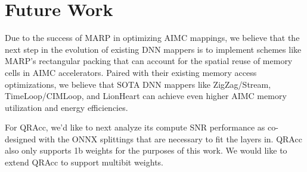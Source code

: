 \section{Future Work}

Due to the success of MARP in optimizing AIMC mappings, we believe that the next step in the evolution of existing DNN mappers is to implement schemes like MARP's rectangular packing that can account for the spatial reuse of memory cells in AIMC accelerators. Paired with their existing memory access optimizations, we believe that SOTA DNN mappers like ZigZag/Stream, TimeLoop/CIMLoop, and LionHeart can achieve even higher AIMC memory utilization and energy efficiencies. 

For QRAcc, we'd like to next analyze its compute SNR performance as co-designed with the ONNX splittings that are necessary to fit the layers in. QRAcc also only supports 1b weights for the purposes of this work. We would like to extend QRAcc to support multibit weights.